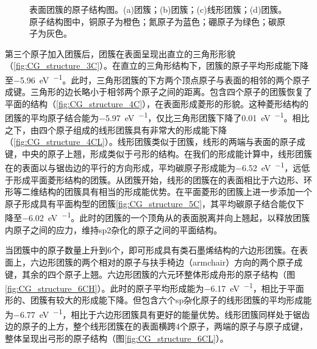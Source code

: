 \begin{figure}[htb]
{            \label{fig:CG_structure_5C}
        }
        \caption{表面团簇的原子结构图。(a)团簇；(b)团簇；(c)线形团簇；(d)团簇。原子结构图中，铜原子为橙色；氮原子为蓝色；硼原子为绿色；碳原子为灰色。}
        \label{fig:CG_structure_3-5C}
    \end{figure}

    第三个原子加入团簇后，团簇在表面呈现出直立的三角形形貌（\ref{fig:CG_structure_3C}）。在直立的三角形结构下，团簇的原子平均形成能下降至\SI{-5.96}{\electronvolt\per\atom}。此时，三角形团簇的下方两个顶点原子与表面的相邻的两个原子成键。三角形的边长略小于相邻两个原子之间的距离。包含四个原子的团簇恢复了平面的结构（\ref{fig:CG_structure_4C}），在表面形成菱形的形貌。这种菱形结构的团簇的平均原子结合能为\SI{-5.97}{\electronvolt\per\atom}，仅比三角形团簇下降了\SI{0.01}{\electronvolt\per\atom}。相比之下，由四个原子组成的线形团簇具有非常大的形成能下降（\ref{fig:CG_structure_4CL}）。线形团簇类似于团簇，线形的两端与表面的原子成键，中央的原子上翘，形成类似于弓形的结构。在我们的形成能计算中，线形团簇在的表面以与锯齿边的平行的方向形成，平均碳原子形成能为\SI{-6.52}{\electronvolt\per\atom}，远低于形成平面菱形结构的团簇。从团簇开始，线形的团簇在的表面相比于六边形、环形等二维结构的团簇具有相当的形成能优势。在平面菱形的团簇上进一步添加一个原子形成具有平面构型的团簇\ref{fig:CG_structure_5C}，其平均碳原子结合能仅下降至\SI{-6.02}{\electronvolt\per\atom}。此时的团簇的一个顶角从的表面脱离并向上翘起，以释放团簇内原子之间的应力，维持sp2杂化的原子之间的平面结构。

    当团簇中的原子数量上升到6个，即可形成具有类石墨烯结构的六边形团簇。在表面上，六边形团簇的两个相对的原子与扶手椅边（armchair）方向的两个原子成键，其余的四个原子上翘。六边形团簇的六元环整体形成舟形的原子结构（图\ref{fig:CG_structure_6CH}）。此时的原子平均形成能为\SI{-6.17}{\electronvolt\per\atom}，相比于平面形的、团簇有较大的形成能下降。但包含六个sp杂化原子的线形团簇的平均形成能为\SI{-6.77}{\electronvolt\per\atom}，相比于六边形团簇具有更好的能量优势。线形团簇同样处于锯齿边的原子的上方，整个线形团簇在的表面横跨4个原子，两端的原子与原子成键，整体呈现出弓形的原子结构（图\ref{fig:CG_structure_6CL}）。

